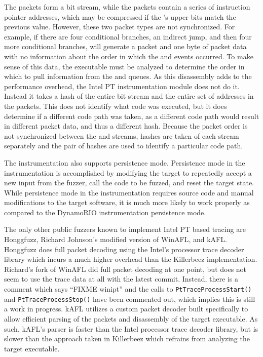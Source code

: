The \TNT{} packets form a bit stream, while the \TIP{} packets contain a series of
instruction pointer addresses, which may be compressed if the \IP{}'s upper bits match
the previous \IP{} value. However, these two packet types are not synchronized. For example, if there are four
conditional branches, an indirect jump, and then four more conditional branches, \IPT{} will generate
a \TIP{} packet and one byte of \TNT{} packet data with no
information about the order in which the \TIP{} and \TNT{} events occurred.  To make sense of
this data, the executable must be analyzed to determine the order in which to
pull information from the \TNT{} and \TIP{} queues. As this disassembly adds to the performance
overhead, the Intel PT instrumentation module does not do it. Instead it
takes a hash of the entire \TNT{} bit stream and the entire set of \IP{} addresses in the \TIP{} packets.
This does not identify what code was executed, but it does determine if a
different code path was taken, as a different code path would result in
different packet data, and thus a different hash. Because the packet order is
not synchronized between the \TNT{} and \TIP{} streams, hashes are taken of each
stream separately and the pair of hashes are used to identify a particular code path.

The \IPT{} instrumentation also supports persistence mode.  Persistence mode in the
\IPT{} instrumentation is accomplished by modifying the target to repeatedly
accept a new input from the fuzzer, call the code to be fuzzed, and reset the
target state.  While persistence mode in the \IPT{} instrumentation requires
source code and manual modifications to the target software, it is much more
likely to work properly as compared to the DynamoRIO instrumentation persistence
mode.

The only other public fuzzers known to implement Intel PT based tracing are
Honggfuzz\cite{honggfuzz}, Richard Johnson's modified version of
WinAFL\cite{winaflintelpt}, and kAFL\cite{kafl}. Honggfuzz does full packet decoding using the
Intel's processor trace decoder library\cite{libipt} which incurs a much
higher overhead than the Killerbeez implementation.  Richard's fork of WinAFL
did full packet decoding at one point, but does not seem to use the trace data
at all with the latest commit.\cite{winaflcommit} Instead, there is a comment which says
``FIXME winipt'' and the calls to \texttt{PtTraceProcessStart()} and
\texttt{PtTraceProcessStop()} have been commented out, which implies this is still a
work in progress. kAFL utilizes a custom packet decoder built specifically to
allow efficient parsing of the \IPT{} packets and disassembly of the target
executable.  As such, kAFL's \IPT{} parser is faster than the Intel processor trace
decoder library, but is slower than the approach taken in Killerbeez which
refrains from analyzing the target executable.

